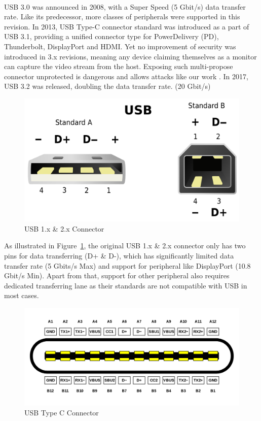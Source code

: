 \noindent{}\\
USB 3.0\cite{usb30} was announced in 2008, with a Super Speed (5 Gbit/s) data transfer rate. Like its predecessor, more classes of peripherals were supported in this revision. In 2013, USB Type-C connector standard was introduced as a part of USB 3.1\cite{usb31}, providing a unified connector type for PowerDelivery (PD), Thunderbolt, DisplayPort and HDMI.  Yet no improvement of security was introduced in 3.x revisions, meaning any device claiming themselves as a monitor can capture the video stream from the host. Exposing such multi-propose connector unprotected is dangerous and allows attacks like our work \tool. In 2017, USB 3.2\cite{usb32} was released, doubling the data transfer rate. (20 Gbit/s)

\noindent{}
\begin{figure}[t]
    \centering
	\includegraphics[width=0.7\linewidth]{./Figs/usb_conn.png}
	\caption{USB 1.x \& 2.x Connector}
	\label{fig:usb_conn}
\end{figure}
As illustrated in Figure~\ref{fig:usb_conn}, the original USB 1.x \& 2.x connector only has two pins for data transferring (D+ \& D-), which has significantly limited data transfer rate (5 Gbits/s Max) and support for peripheral like DisplayPort (10.8 Gbit/s Min). Apart from that, support for other peripheral also requires dedicated transferring lane as their standards are not compatible with USB in most cases.
\begin{figure}[t]
	\centering
	\includegraphics[width=\linewidth]{./Figs/usb_c_conn.png}
	\caption{USB Type C Connector}
	\label{fig:usb_c_conn}
\end{figure}

